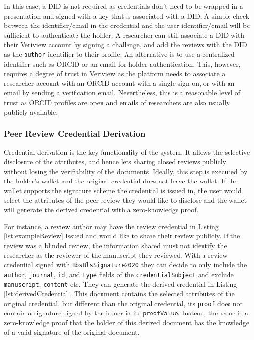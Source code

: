 In this case, a \acrshort{DID} is not required as credentials don't need to be wrapped in a presentation and signed with a key that is associated with a \acrshort{DID}. A simple check between the identifier/email in the credential and the user identifier/email will be sufficient to authenticate the holder. A researcher can still associate a \acrshort{DID} with their Veriview account by signing a challenge, and add the reviews with the \acrshort{DID} as the \lstinline{author} identifier to their profile. An alternative is to use a centralized identifier such as \acrshort{ORCID} or an email for holder authentication. This, however, requires a degree of trust in Veriview as the platform needs to associate a researcher account with an \acrshort{ORCID} account with a single sign-on, or with an email by sending a verification email. Nevertheless, this is a reasonable level of trust as \acrshort{ORCID} profiles are open and emails of researchers are also usually publicly available.

\subsubsection{Peer Review Credential Derivation}

Credential derivation is the key functionality of the system. It allows the selective disclosure of the attributes, and hence lets sharing closed reviews publicly without losing the verifiability of the documents. Ideally, this step is executed by the holder's wallet and the original credential does not leave the wallet. If the wallet supports the signature scheme the credential is issued in, the user would select the attributes of the peer review they would like to disclose and the wallet will generate the derived credential with a zero-knowledge proof.

For instance, a review author may have the review credential in Listing \ref{lst:exampleReview} issued and would like to share their review publicly. If the review was a blinded review, the information shared must not identify the researcher as the reviewer of the manuscript they reviewed. With a review credential signed with \lstinline{BbsBlsSignature2020} they can decide to only include the \lstinline{author}, \lstinline{journal}, \lstinline{id}, and \lstinline{type} fields of the \lstinline{credentialSubject} and exclude \lstinline{manuscript}, \lstinline{content} etc. They can generate the derived credential in Listing \ref{lst:derivedCredential}. This document contains the selected attributes of the original credential, but different than the original credential, its \lstinline{proof} does not contain a signature signed by the issuer in its \lstinline{proofValue}. Instead, the value is a zero-knowledge proof that the holder of this derived document has the knowledge of a valid signature of the original document.

